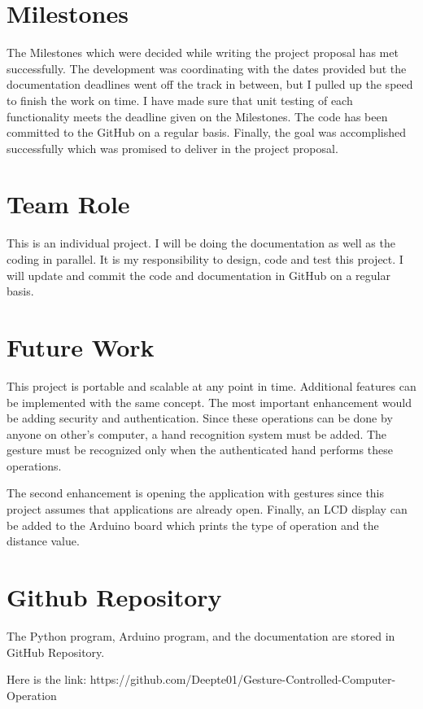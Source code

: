 \documentclass[12pt,journal]{IEEEtran}
\begin{document}
\section{Milestones}
\par The Milestones which were decided while writing the project proposal has met successfully. The development was coordinating with the dates provided but the documentation deadlines went off the track in between, but I pulled up the speed to finish the work on time. I have made sure that unit testing of each functionality meets the deadline given on the Milestones. The code has been committed to the GitHub on a regular basis. Finally, the goal was accomplished successfully which was promised to deliver in the project proposal.

\section{Team Role}
This is an individual project. I will be doing the documentation as well as the coding in parallel. It is my responsibility to
design, code and test this project. I will update and commit the code and documentation in GitHub on a regular basis.

\section{Future Work} This project is portable and scalable at any point in time. Additional features can be implemented with the same concept. The most important enhancement would be adding security and authentication. Since these operations can be done by anyone on other’s computer, a hand recognition system must be added. The gesture must be recognized only when the authenticated hand performs these operations. 
\par The second enhancement is opening the application with gestures since this project assumes that applications are already open. 
Finally, an LCD display can be added to the Arduino board which prints the type of operation and the distance value.

\section{Github Repository}
The Python program, Arduino program, and the documentation are stored in GitHub Repository.
\par Here is the link: https://github.com/Deepte01/Gesture-Controlled-Computer-Operation
\end{document}
